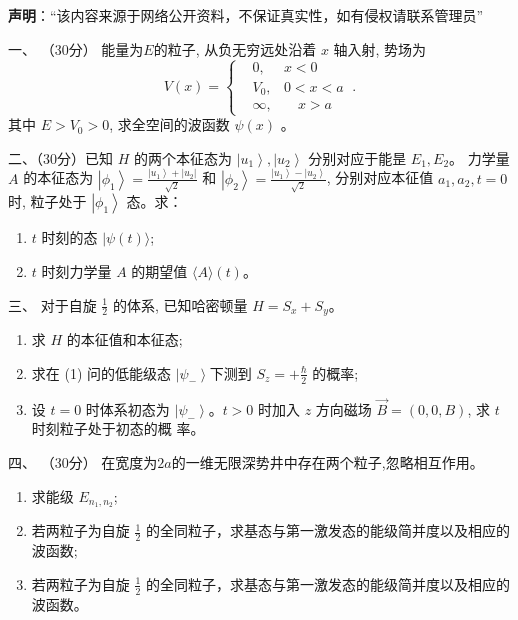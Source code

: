 
\textbf{声明}：“该内容来源于网络公开资料，不保证真实性，如有侵权请联系管理员”

一、
	（30分） 能量为$  E $的粒子, 从负无穷远处沿着 $x$ 轴入射, 势场为
	\[ 
	V(x)=\left\{\begin{aligned}&0, &  x<0 \\ &V_{0}, & 0<x<a \\ &\infty, &  \quad x>a\end{aligned}\right. ~.
	 \] 
	其中 $E>V_{0}>0$, 求全空间的波函数 $\psi(x)$ 。



二、（30分）已知 $H$ 的两个本征态为 $\left|u_{1}\right\rangle,\left|u_{2}\right\rangle$ 分别对应于能昰 $E_{1}, E_{2}$。 力学量 $A$ 的本征态为	
$\left|\phi_{1}\right\rangle=\frac{\left|u_{1}\right\rangle+\left|u_{2}\right|}{\sqrt{2}}$ 和 $\left|\phi_{2}\right\rangle=\frac{\left|u_{1}\right\rangle-\left|u_{2}\right\rangle}{\sqrt{2}}$, 分别对应本征值 $a_{1}, a_{2}, t=0$ 时, 粒子处于 $\left|\phi_{1}\right\rangle$ 态。求：
\begin{enumerate}
	\item
	$t$ 时刻的态 $|\psi(t)\rangle$;
	\item
	 $t$ 时刻力学量 $A$ 的期望值 $\langle A\rangle(t)$。
	
	
	
\end{enumerate}

三、
对于自旋 $\frac{1}{2}$ 的体系, 已知哈密顿量 $H=S_{x}+S_{y}$。
\begin{enumerate}
	\item
	求 $H$ 的本征值和本征态;
	\item
	求在 (1) 问的低能级态 $\left|\psi_{-}\right\rangle$下测到 $S_{z}=+\frac{\hbar}{2}$ 的概率;
	\item 
	设 $t=0$ 时体系初态为 $\left|\psi_{-}\right\rangle $。$ t>0$ 时加入 $z$ 方向磁场 $\vec{B}=(0,0, B)$, 求 $t$ 时刻粒子处于初态的概 率。
	
\end{enumerate}



四、
（30分）
在宽度为$ 2a $的一维无限深势井中存在两个粒子,忽略相互作用。
\begin{enumerate}
	\item
	求能级 $E_{n_{1}, n_{2}}$;
	\item
	若两粒子为自旋 $\frac{1}{2}$ 的全同粒子，求基态与第一激发态的能级简并度以及相应的波函数;
	\item
	若两粒子为自旋 $\frac{1}{2}$ 的全同粒子，求基态与第一激发态的能级简并度以及相应的波函数。
	
	
	
\end{enumerate}

